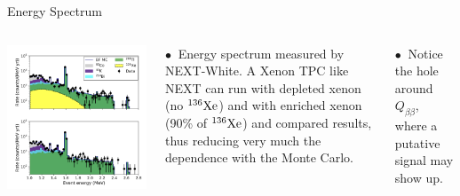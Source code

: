 \documentclass [aspectratio=169]{beamer}
\newcommand{\qbb}{\ensuremath{Q_{\beta\beta}}}
\newcommand{\XE}{\ensuremath{{}^{136}{\rm Xe}}}
\begin{document}
\begin{frame}{Energy Spectrum}
\begin{columns}
\includegraphics[scale=0.26]{newSpectrum.png}

$\bullet~$ Energy spectrum measured by NEXT-White. A Xenon TPC like NEXT can run with depleted xenon (no \XE) and with enriched xenon (90\% of \XE) and compared results, thus reducing very much the dependence with the Monte Carlo. 

$\bullet~$ Notice the hole around \qbb, where a putative signal may show up. 
 \end{columns}
\end{frame}
\end{document}
